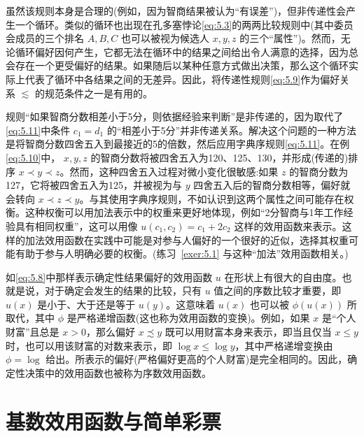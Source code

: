 虽然该规则本身是合理的(例如，因为智商结果被认为“有误差”)，但非传递性会产生一个循环。类似的循环也出现在孔多塞悖论\eqref{eq:5.3}的两两比较规则中(其中委员会成员的三个排名 \(A,B,C\) 也可以被视为候选人 \(x,y,z\) 的三个“属性”)。然而，无论循环偏好因何产生，它都无法在循环中的结果之间给出令人满意的选择，因为总会存在一个更受偏好的结果。如果随后以某种任意方式做出决策，那么这个循环实际上代表了循环中各结果之间的无差异。因此，将传递性规则\eqref{eq:5.9}作为偏好关系 \(\lesssim\) 的规范条件之一是有用的。

规则“如果智商分数相差小于5分，则依据经验来判断”是非传递的，因为取代了\eqref{eq:5.11}中条件 \({c}_{1} = {d}_{1}\) 的“相差小于5分”并非传递关系。解决这个问题的一种方法是将智商分数四舍五入到最接近的5的倍数，然后应用字典序规则\eqref{eq:5.11}。在例\eqref{eq:5.10}中， \(x,y,z\) 的智商分数将被四舍五入为120、125、130，并形成(传递的)排序 \(x \prec  y \prec  z\)。然而，这种四舍五入过程对微小变化很敏感:如果 \(z\) 的智商分数为127，它将被四舍五入为125，并被视为与 \(y\) 四舍五入后的智商分数相等，偏好就会转向 \(x \prec  z \prec  y\)。与其使用字典序规则，不如认识到这两个属性之间可能存在权衡。这种权衡可以用加法表示中的权重来更好地体现，例如“2分智商与1年工作经验具有相同权重”，这可以用像 \(u\left( {{c}_{1},{c}_{2}}\right)  = {c}_{1} + 2{c}_{2}\) 这样的效用函数来表示。这样的加法效用函数在实践中可能是对参与人偏好的一个很好的近似，选择其权重可能有助于参与人明确必要的权衡。(练习~\ref{exer:5.1} 与这种“加法”效用函数相关。)

如\eqref{eq:5.8}中那样表示确定性结果偏好的效用函数 \(u\) 在形状上有很大的自由度。也就是说，对于确定会发生的结果的比较，只有 \(u\) 值之间的序数比较才重要，即 \(u\left( x\right)\) 是小于、大于还是等于 \(u\left( y\right)\)。这意味着 \(u\left( x\right)\) 也可以被 \(\phi \left( {u\left( x\right) }\right)\) 所取代，其中 \(\phi\) 是严格递增函数(这也称为效用函数的变换)。例如，如果 \(x\) 是“个人财富”且总是 \(x > 0\)，那么偏好 \(x \precsim  y\) 既可以用财富本身来表示，即当且仅当 \(x \leq  y\) 时，也可以用该财富的对数来表示，即 \(\log x \leq  \log y\)，其中严格递增变换由 \(\phi  = \log\) 给出。所表示的偏好(严格偏好更高的个人财富)是完全相同的。因此，确定性决策中的效用函数也被称为序数效用函数。

\section{ 基数效用函数与简单彩票}\label{sec:5.6}

